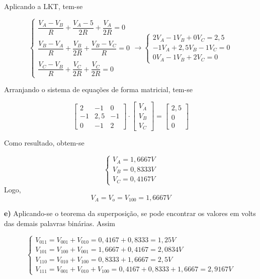 Aplicando a LKT, tem-se

\[
  \begin{cases}
    \dfrac{V_A - V_B }{R} + \dfrac{V_A - 5}{2R} + \dfrac{V_A}{2R} =0\\
    \\
    \dfrac{V_B-V_A}{R} + \dfrac{V_B}{2R} + \dfrac{V_B-V_C}{R} =0\\
    \\
    \dfrac{V_C-V_B}{R} + \dfrac{V_C}{2R} + \dfrac{V_C}{2R} =0
  \end{cases}
  \rightarrow
  \begin{cases}
    2V_A -1V_B + 0V_C=2,5\\
    -1V_A+2,5V_B-1V_C=0\\
    0V_A-1V_B+2V_C=0
  \end{cases}
\]

Arranjando o sistema de equações de forma matricial, tem-se

\[
  \begin{bmatrix}
    2 & -1 & 0\\
    -1 & 2,5 & -1\\
    0 & -1 & 2
  \end{bmatrix}
  \cdot
  \begin{bmatrix}
    V_A\\V_B\\V_C
  \end{bmatrix}
  =
  \begin{bmatrix}
    2,5\\0\\0
  \end{bmatrix}
\]

Como resultado, obtem-se

\[
  \begin{cases}
    V_A=1,6667V\\V_B=0,8333V\\V_C=0,4167V
  \end{cases}
\]
Logo,
\begin{equation}
  V_A=V_o=V_{100}=1,6667V
\end{equation}

\textbf{e)} Aplicando-se o teorema da superposição, se pode encontrar os valores em volts das demais palavras binárias. Assim

\[
  \begin{cases}
    V_{011}=V_{001}+V_{010}=0,4167+0,8333=1,25V\\
    V_{101}=V_{100}+V_{001}=1,6667+0,4167=2,0834V\\
    V_{110}=V_{010}+V_{100}=0,8333+1,6667=2,5V\\
    V_{111}=V_{001}+V_{010}+V_{100}=0,4167+0,8333+1,6667=2,9167V
  \end{cases}
\]

